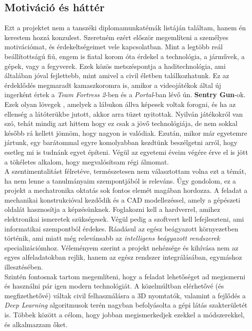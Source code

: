 \documentclass[12pt,a4paper]{article}
\begin{document}
\subsection{Motiváció és háttér}

\lettrine{E}zt a projektet nem a tanszéki diplomamunkatémák listáján találtam, hanem én kerestem hozzá konzulest. Szeretném ezért először megemlíteni a személyes motivációmat, és érdekeltségeimet vele kapcsolatban. Mint a legtöbb reál beállítottságú fiú, engem is fiatal korom óta érdekel a technológia, a járművek, a gépek, vagy a fegyverek. Ezek közös metszéspontja a haditechnológia, ami általában jóval fejlettebb, mint amivel a civil életben találkozhatunk. Ez az érdeklődés megmaradt kamaszkoromra is, amikor a videojátékok által új ingerként értek a \textsl{Team Fortress 2}-ben és a \textsl{Portal}-ban lévő ún. \textbf{Sentry Gun}-ok. Ezek olyan lövegek , amelyek a lábukon állva képesek voltak forogni, és ha az ellenség a látóterükbe jutott, akkor arra tüzet nyitottak. Nyilván játékokról van szó, tehát mindig azt hittem hogy ez csak a jövő technológiája, de nem sokkal később rá kellett jönnöm, hogy nagyon is valódiak. Ezután, mikor már egyetemre jártunk, egy barátommal egyre komolyabban kezdtünk beszélgetni arról, hogy esetleg mi is tudnánk egyet építeni. Végül az egyetemi éveim végére érve el is jött a tökéletes alkalom, hogy megvalósítsam régi álmomat. \\

A szentimentalitást félretéve, természetesen nem választottam volna ezt a témát, ha nem lenne a tanulmányaim szempontjából is releváns. Úgy gondolom, ez a projekt a mechatronika oktatás sok fontos elemét magában hordozza. A feladat a mechanikai konstrukcióval kezdődik és a CAD modellezéssel, amely a gépészeti oldalát hasznosítja a képzésünknek. Foglakozni kell a hardverrel, amihez elektronikai ismeretek szükségesek. Végül pedig a szoftvert kell lefejleszteni, ami informatikai szempontból érdekes. Ráadásul az egész beágyazott környezetben történik, ami miatt még relevánsabb az \textsl{intelligens beágyazott rendszerek} specializációmhoz. Véleményem szerint a projekt nehézsége és kihívása nem az egyes alfeladatokban rejlik, hanem az egész rendszer integrálásában, egymáshoz illesztésében. \\

Szintén fontosnak tartom megemlíteni, hogy a feladat lehetőséget ad megismerni és használni pár igen modern technológiát. A közelmúltban elérhetővé (és megfizethetővé) váltak civil felhasználásra a 3D nyomtatók, valamint a fejlődés a \textsl{Deep Learning} algoritmusok terén nagyban befolyásolta a gépi látás szakterületét is. Többek között a célom, hogy jobban megismerkedjek ezekkel a módszerekkel, és alkalmazzam őket.
\end{document}
